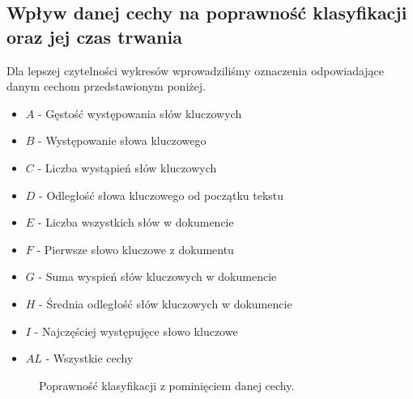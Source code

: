 \documentclass{classrep}
\begin{document}
\subsection{Wpływ danej cechy na poprawność klasyfikacji oraz jej czas trwania}
Dla lepszej czytelności wykresów wprowadziliśmy oznaczenia odpowiadające danym cechom przedstawionym
poniżej.
\begin{itemize}
    \item $A$ - Gęstość występowania słów kluczowych
    \item $B$ - Występowanie słowa kluczowego
    \item $C$ - Liczba wystąpień słów kluczowych
    \item $D$ - Odległość słowa kluczowego od początku tekstu
    \item $E$ - Liczba wszystkich słów w dokumencie
    \item $F$ - Pierwsze słowo kluczowe z dokumentu
    \item $G$ - Suma wyspień słów kluczowych w dokumencie
    \item $H$ - Średnia odległość słów kluczowych w dokumencie
    \item $I$ - Najczęściej występujęce słowo kluczowe
    \item $AL$ - Wszystkie cechy
\end{itemize}

\begin{figure}[h!]
    \begin{center}
    \end{center}
    \caption{Poprawność klasyfikacji z pominięciem danej cechy.}
    \label{cecha_poprawnosc}
\end{figure}
\end{document}
